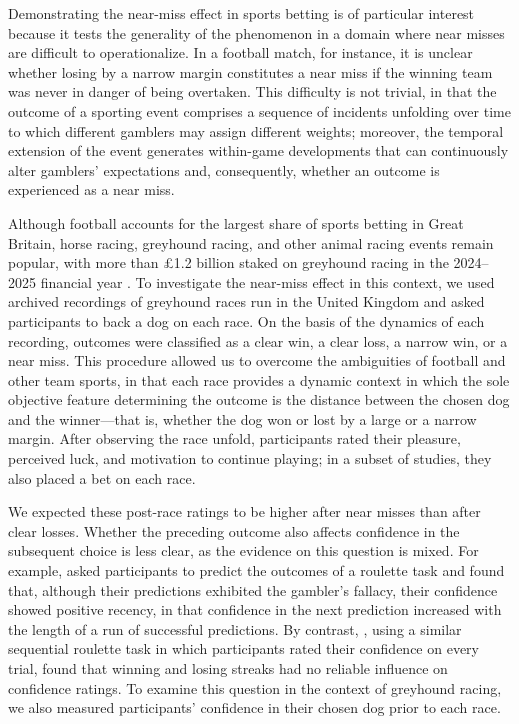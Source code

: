 \documentclass[man,floatsintext,donotrepeattitle]{apa7}
\begin{document}
Demonstrating the near-miss effect in sports betting is of particular interest because it tests the generality of the phenomenon in a domain where near misses are difficult to operationalize. In a football match, for instance, it is unclear whether losing by a narrow margin constitutes a near miss if the winning team was never in danger of being overtaken. This difficulty is not trivial, in that the outcome of a sporting event comprises a sequence of incidents unfolding over time to which different gamblers may assign different weights; moreover, the temporal extension of the event generates within-game developments that can continuously alter gamblers' expectations and, consequently, whether an outcome is experienced as a near miss.

Although football accounts for the largest share of sports betting in Great Britain, horse racing, greyhound racing, and other animal racing events remain popular, with more than \pounds1.2 billion staked on greyhound racing in the 2024--2025 financial year \parencite{gamblingcommission2025}. To investigate the near-miss effect in this context, we used archived recordings of greyhound races run in the United Kingdom and asked participants to back a dog on each race. On the basis of the dynamics of each recording, outcomes were classified as a clear win, a clear loss, a narrow win, or a near miss. This procedure allowed us to overcome the ambiguities of football and other team sports, in that each race provides a dynamic context in which the sole objective feature determining the outcome is the distance between the chosen dog and the winner---that is, whether the dog won or lost by a large or a narrow margin. After observing the race unfold, participants rated their pleasure, perceived luck, and motivation to continue playing; in a subset of studies, they also placed a bet on each race.

We expected these post-race ratings to be higher after near misses than after clear losses. Whether the preceding outcome also affects confidence in the subsequent choice is less clear, as the evidence on this question is mixed. For example, \textcite{aytonfischer2004} asked participants to predict the outcomes of a roulette task and found that, although their predictions exhibited the gambler's fallacy, their confidence showed positive recency, in that confidence in the next prediction increased with the length of a run of successful predictions. By contrast, \textcite{studer2015}, using a similar sequential roulette task in which participants rated their confidence on every trial, found that winning and losing streaks had no reliable influence on confidence ratings. To examine this question in the context of greyhound racing, we also measured participants' confidence in their chosen dog prior to each race.
\end{document}
